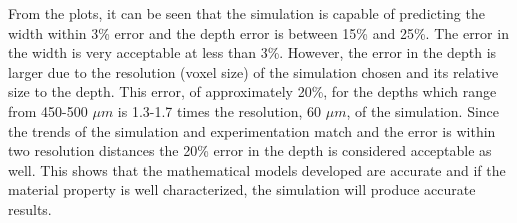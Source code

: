 From the plots, it can be seen that the simulation is capable of predicting the width within 3\% error and the depth error is between 15\% and 25\%.  The error in the width is very acceptable at less than 3\%.
However, the error in the depth is larger due to the resolution (voxel size) of the simulation chosen and its relative size to the depth.  This error, of approximately 20\%, for the depths which range from 450-500 $\mu m$ is 1.3-1.7 times the resolution, 60 $\mu m$, of the simulation.  Since the trends of the simulation and experimentation match and the error is within two resolution distances the 20\% error in the depth is considered acceptable as well. 
This shows that the mathematical models developed are accurate and if the material property is well characterized, the simulation will produce accurate results.

